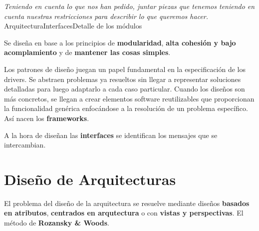 \begin{center}
  \textit{Teniendo en cuenta lo que nos han pedido, juntar piezas que
    tenemos teniendo en cuenta nuestras restricciones para describir lo que queremos
    hacer.}
  Arquitectura\textrightarrow Interfaces\textrightarrow Detalle de los módulos
\end{center}

Se diseña en base a los principios de \textbf{modularidad},
\textbf{alta cohesión y bajo acomplamiento} y de \textbf{mantener las
  cosas simples}.

Los patrones de diseño juegan un papel fundamental en la especificación
de los drivers. Se abstraen problemas ya
resueltos sin llegar a representar soluciones detalladas para luego
adaptarlo a cada caso particular. Cuando los diseños son más
concretos, se llegan a crear elementos software reutilizables que
proporcionan la funcionalidad genérica enfocándose a la resolución de
un problema específico. Así nacen los \textbf{frameworks}.

A la hora de diseñan las \textbf{interfaces} se identifican los
mensajes que se intercambian.

\section{Diseño de Arquitecturas}
\label{sec:arquitectura:diseñoarquitectura}

El problema del diseño de la arquitectura se resuelve mediante diseños
\textbf{basados en atributos}, \textbf{centrados en arqutectura} o con
\textbf{vistas y perspectivas}. El método de \textbf{Rozansky \&
  Woods}.


